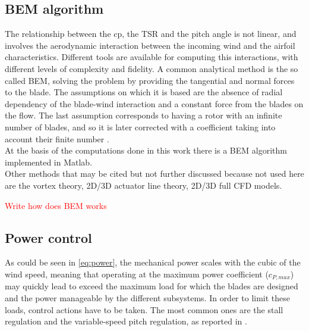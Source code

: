 \subsection{BEM algorithm}
The relationship between the \acrshort{cp}, the \acrshort{TSR} and the pitch angle is not linear, and involves the aerodynamic interaction between the incoming wind and the airfoil characteristics. Different tools are available for computing this interactions, with different levels of complexity and fidelity. A common analytical method is the so called \acrfull{BEM}, solving the problem by providing the tangential and normal forces to the blade. The assumptions on which it is based are the absence of radial dependency of the blade-wind interaction and a constant force from the blades on the flow. The last assumption corresponds to having a rotor with an infinite number of blades, and so it is later corrected with a coefficient taking into account their finite number \cite{Aerodynamics_of_wind_turbines}.\\
At the basis of the computations done in this work there is a \acrshort{BEM} algorithm implemented in Matlab.\\
Other methods that may be cited but not further discussed because not used here are the vortex theory, 2D/3D actuator line theory, 2D/3D full CFD models.

\textcolor{red}{Write how does BEM works}

\subsection{Power control}
As could be seen in \autoref{eq:power}, the mechanical power scales with the cubic of the wind speed, meaning that operating at the maximum power coefficient ($c_{P, max}$) may quickly lead to exceed the maximum load for which the blades are designed and the power manageable by the different subsystems. In order to limit these loads, control actions have to be taken. The most common ones are the stall regulation and the variable-speed pitch regulation, as reported in \cite{Aerodynamics_of_wind_turbines}.
